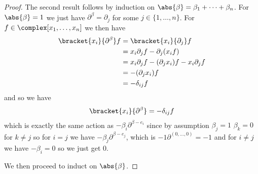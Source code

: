 \documentclass[fleqn]{NotesClass}
\begin{document}
\begin{lma}{}{}
\begin{proof}
            The second result follows by induction on \(\abs{\beta} = \beta_1 + \dotsb + \beta_n\).
            For \(\abs{\beta} = 1\) we just have \(\partial^\beta = \partial_j\) for some \(j \in \{1, \dotsc, n\}\).
            For \(f \in \complex[x_1, \dotsc, x_n]\) we then have
            \begin{align}
                \bracket{x_i}{\partial^\beta}f &= \bracket{x_i}{\partial_j}f\\
                &= x_i\partial_jf - \partial_j(x_i f)\\
                &= x_i\partial_jf - (\partial_j x_i) f - x_i \partial_j f\\
                &= -(\partial_j x_i) f\\
                &= -\delta_{ij} f
            \end{align}
            and so we have
            \begin{equation}
                \bracket{x_i}{\partial^\beta} = -\delta_{ij}f
            \end{equation}
            which is exactly the same action as \(-\beta_i \partial^{\beta - e_i}\) since by assumption \(\beta_j = 1\) \(\beta_k = 0\) for \(k \ne j\) so for \(i = j\) we have \(-\beta_j\partial^{\beta - e_j}\), which is \(-1\partial^{(0, \dotsc, 0)} = -1\) and for \(i \ne j\) we have \(-\beta_i = 0\) so we just get \(0\).
            
            We then proceed to induct on \(\abs{\beta}\).
        \end{proof}
    \end{lma}
    
    
%        
    \backmatter
    \renewcommand{\glossaryname}{Acronyms}
    \printglossary[acronym]
    \printindex
\end{document}

